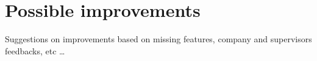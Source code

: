 \section{Possible improvements}

Suggestions on improvements based on missing features, company and supervisors feedbacks, etc \dots